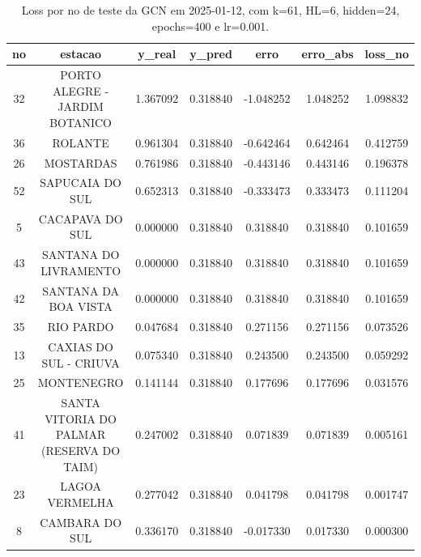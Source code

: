 \begin{table}[h]
\centering
\caption{Loss por no de teste da GCN em 2025-01-12, com k=61, HL=6, hidden=24, epochs=400 e lr=0.001.}
\label{tab:gcn_loss_k61_hl6_h24_e400_d20250112}
\begin{tabular}{ccccccc}
\toprule
no & estacao & y\_real & y\_pred & erro & erro\_abs & loss\_no \\
\midrule
32 & PORTO ALEGRE - JARDIM BOTANICO & 1.367092 & 0.318840 & -1.048252 & 1.048252 & 1.098832 \\
36 & ROLANTE & 0.961304 & 0.318840 & -0.642464 & 0.642464 & 0.412759 \\
26 & MOSTARDAS & 0.761986 & 0.318840 & -0.443146 & 0.443146 & 0.196378 \\
52 & SAPUCAIA DO SUL & 0.652313 & 0.318840 & -0.333473 & 0.333473 & 0.111204 \\
5 & CACAPAVA DO SUL & 0.000000 & 0.318840 & 0.318840 & 0.318840 & 0.101659 \\
43 & SANTANA DO LIVRAMENTO & 0.000000 & 0.318840 & 0.318840 & 0.318840 & 0.101659 \\
42 & SANTANA DA BOA VISTA & 0.000000 & 0.318840 & 0.318840 & 0.318840 & 0.101659 \\
35 & RIO PARDO & 0.047684 & 0.318840 & 0.271156 & 0.271156 & 0.073526 \\
13 & CAXIAS DO SUL - CRIUVA & 0.075340 & 0.318840 & 0.243500 & 0.243500 & 0.059292 \\
25 & MONTENEGRO & 0.141144 & 0.318840 & 0.177696 & 0.177696 & 0.031576 \\
41 & SANTA VITORIA DO PALMAR (RESERVA DO TAIM) & 0.247002 & 0.318840 & 0.071839 & 0.071839 & 0.005161 \\
23 & LAGOA VERMELHA & 0.277042 & 0.318840 & 0.041798 & 0.041798 & 0.001747 \\
8 & CAMBARA DO SUL & 0.336170 & 0.318840 & -0.017330 & 0.017330 & 0.000300 \\
\bottomrule
\end{tabular}
\end{table}
